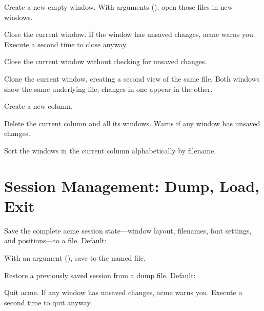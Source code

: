 \begin{description}[style=nextline]
\item[\cmd{New}]
Create a new empty window.  With arguments (), open those files in new windows.

\item[\cmd{Del}]
Close the current window.  If the window has unsaved changes, acme
warns you.  Execute  a second time to close anyway.

\item[\cmd{Delete}]
Close the current window without checking for unsaved changes.

\item[\cmd{Zerox}]
Clone the current window, creating a second view of the same file.
Both windows show the same underlying file; changes in one appear in
the other.

\item[\cmd{Newcol}]
Create a new column.

\item[\cmd{Delcol}]
Delete the current column and all its windows.  Warns if any window
has unsaved changes.

\item[\cmd{Sort}]
Sort the windows in the current column alphabetically by filename.
\end{description}

\section{Session Management: Dump, Load, Exit}
\label{sec:session}


\begin{description}[style=nextline]
\item[\cmd{Dump}]
Save the complete acme session state---window layout, filenames, font
settings, and positions---to a file.  Default: .

With an argument (), save to the named
file.

\item[\cmd{Load}]
Restore a previously saved session from a dump file.  Default:
.

\item[\cmd{Exit}]
Quit acme.  If any window has unsaved changes, acme warns you.
Execute  a second time to quit anyway.
\end{description}


